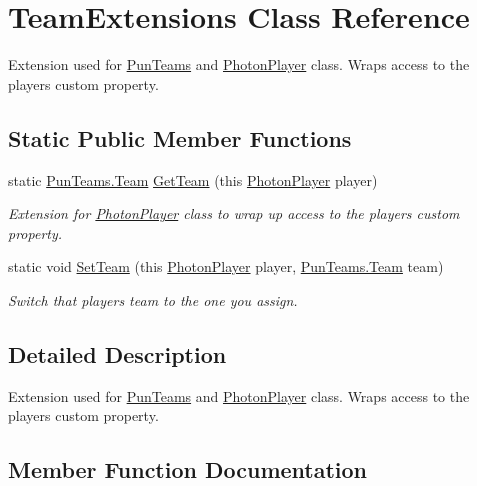 \hypertarget{class_team_extensions}{}\section{Team\+Extensions Class Reference}
\label{class_team_extensions}


Extension used for \hyperlink{class_pun_teams}{Pun\+Teams} and \hyperlink{class_photon_player}{Photon\+Player} class. Wraps access to the player\textquotesingle{}s custom property. 


\subsection*{Static Public Member Functions}
\begin{DoxyCompactItemize}
\item 
static \hyperlink{class_pun_teams_a933d84000474f43931805990b241a2a7}{Pun\+Teams.\+Team} \hyperlink{class_team_extensions_aec3b2ec1287d58cdf02cdb0b23f81686}{Get\+Team} (this \hyperlink{class_photon_player}{Photon\+Player} player)
\begin{DoxyCompactList}\small\item\em Extension for \hyperlink{class_photon_player}{Photon\+Player} class to wrap up access to the player\textquotesingle{}s custom property. \end{DoxyCompactList}\item 
static void \hyperlink{class_team_extensions_a8fadc4d8cef73f182ad4ab397a68f401}{Set\+Team} (this \hyperlink{class_photon_player}{Photon\+Player} player, \hyperlink{class_pun_teams_a933d84000474f43931805990b241a2a7}{Pun\+Teams.\+Team} team)
\begin{DoxyCompactList}\small\item\em Switch that player\textquotesingle{}s team to the one you assign. \end{DoxyCompactList}\end{DoxyCompactItemize}


\subsection{Detailed Description}
Extension used for \hyperlink{class_pun_teams}{Pun\+Teams} and \hyperlink{class_photon_player}{Photon\+Player} class. Wraps access to the player\textquotesingle{}s custom property.



\subsection{Member Function Documentation}
